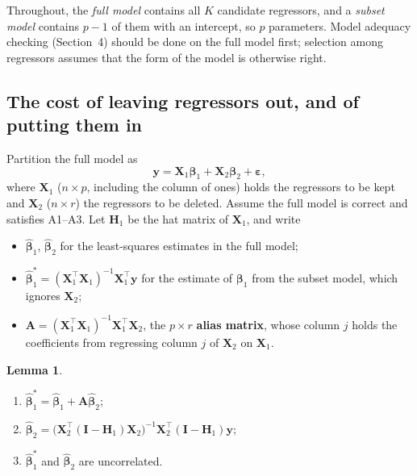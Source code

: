 \documentclass[11pt,a4paper]{article}
\numberwithin{equation}{section}
\theoremstyle{definition}
\newtheorem{lem}[thm]{Lemma}
\begin{document}
Throughout, the \emph{full model} contains all $K$ candidate regressors, and a \emph{subset model}
contains $p - 1$ of them with an intercept, so $p$ parameters. Model adequacy checking
(Section~4) should be done on the full model first; selection among regressors assumes that the
form of the model is otherwise right.

\subsection{The cost of leaving regressors out, and of putting them in}
Partition the full model as
\[
\mathbf{y} = \mathbf{X}_1\boldsymbol\beta_1 + \mathbf{X}_2\boldsymbol\beta_2 + \boldsymbol\varepsilon ,
\]
where $\mathbf{X}_1$ ($n \times p$, including the column of ones) holds the regressors to be kept and
$\mathbf{X}_2$ ($n \times r$) the regressors to be deleted. Assume the full model is correct and
satisfies A1--A3. Let $\mathbf{H}_1$ be the hat matrix of $\mathbf{X}_1$, and write
\begin{itemize}
\item $\hat{\boldsymbol\beta}_1$, $\hat{\boldsymbol\beta}_2$ for the least-squares estimates in the full model;
\item $\hat{\boldsymbol\beta}_1^* = (\mathbf{X}_1^\top\mathbf{X}_1)^{-1}\mathbf{X}_1^\top\mathbf{y}$ for the estimate of
$\boldsymbol\beta_1$ from the subset model, which ignores $\mathbf{X}_2$;
\item $\mathbf{A} = (\mathbf{X}_1^\top\mathbf{X}_1)^{-1}\mathbf{X}_1^\top\mathbf{X}_2$, the $p \times r$ \textbf{alias matrix},
whose column $j$ holds the coefficients from regressing column $j$ of $\mathbf{X}_2$ on $\mathbf{X}_1$.
\end{itemize}

\begin{lem}\label{lem:partitioned}
\begin{enumerate}[label=(\roman*)]
\item $\hat{\boldsymbol\beta}_1^* = \hat{\boldsymbol\beta}_1 + \mathbf{A}\hat{\boldsymbol\beta}_2$;
\item $\hat{\boldsymbol\beta}_2 = \bigl(\mathbf{X}_2^\top(\mathbf{I} - \mathbf{H}_1)\mathbf{X}_2\bigr)^{-1}\mathbf{X}_2^\top(\mathbf{I} - \mathbf{H}_1)\mathbf{y}$;
\item $\hat{\boldsymbol\beta}_1^*$ and $\hat{\boldsymbol\beta}_2$ are uncorrelated.
\end{enumerate}
\end{lem}
\end{document}
